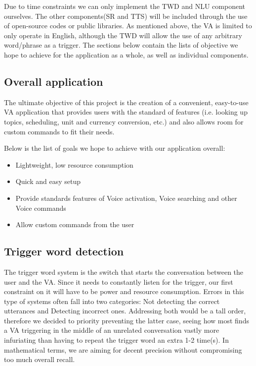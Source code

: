     Due to time constraints we can only implement the TWD and NLU component ourselves. The other components(SR and TTS) will be included through the use of open-source codes or public libraries. As mentioned above, the VA is limited to only operate in English, although the TWD will allow the use of any arbitrary  word/phrase as a trigger. The sections below contain the lists of objective we hope to achieve for the application as a whole, as well as individual components.

\subsection{Overall application}
    The ultimate objective of this project is the creation of a convenient, easy-to-use VA application that provides users with the standard of features (i.e. looking up topics, scheduling, unit and currency conversion, etc.) and also allows room for custom commands to fit their needs.
    
    Below is the list of goals we hope to achieve with our application overall:
    \begin{itemize}
        \item Lightweight, low resource consumption
        \item Quick and easy setup
        \item Provide standards features of Voice activation, Voice searching and other Voice commands
        \item Allow custom commands from the user
    \end{itemize}
\subsection{Trigger word detection}
    The trigger word system is the switch that starts the conversation between the user and the VA. Since it needs to constantly listen for the trigger, our first constraint on it will have to be power and resource consumption. Errors in this type of systems often fall into two categories: Not detecting the correct utterances and Detecting incorrect ones. Addressing both would be a tall order, therefore we decided to priority preventing the latter case, seeing how most finds a VA triggering in the middle of an unrelated conversation vastly more infuriating than having to repeat the trigger word an extra 1-2 time(s).  In mathematical terms, we are aiming for decent precision without compromising too much overall recall.
    
